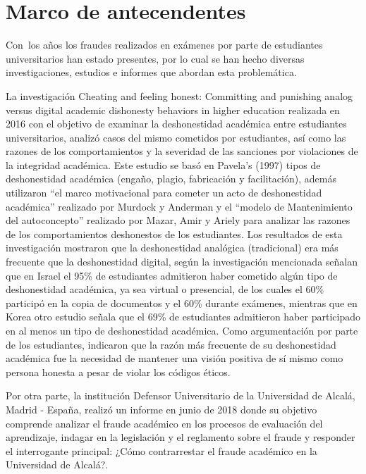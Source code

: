 \documentclass[../Main.tex]{subfiles}
\begin{document}
\section{Marco de antecendentes}

\begin{justify}
Con\ los años los fraudes realizados en exámenes por parte de estudiantes universitarios han estado presentes, por lo cual se han hecho diversas investigaciones, estudios e informes  que abordan esta problemática.
\end{justify}\par

\begin{justify}
La investigación Cheating and feeling honest: Committing and punishing analog versus digital academic dishonesty behaviors in higher education \cite{5} realizada en 2016 con el objetivo de examinar la deshonestidad académica entre estudiantes universitarios, analizó casos del mismo cometidos por estudiantes, así como las razones de los comportamientos y la severidad de las sanciones por violaciones de la integridad académica. Este estudio se basó en Pavela’s (1997) \cite{6} tipos de deshonestidad académica (engaño, plagio, fabricación y facilitación), además utilizaron “el marco motivacional para cometer un acto de deshonestidad académica” realizado por Murdock y Anderman \cite{7} y el “modelo de Mantenimiento del autoconcepto” realizado por Mazar, Amir y Ariely \cite{8} para analizar las razones de los comportamientos deshonestos de los estudiantes. Los resultados de esta investigación mostraron que la deshonestidad analógica (tradicional) era más frecuente que la deshonestidad digital, según la investigación mencionada señalan que en Israel el 95\% de estudiantes admitieron haber cometido algún tipo de deshonestidad académica, ya sea virtual o presencial, de los cuales el 60\% participó en la copia de documentos y el 60\% durante exámenes, mientras que en Korea otro estudio señala que el 69\% de estudiantes admitieron haber participado en al menos un tipo de deshonestidad académica. Como argumentación por parte de los estudiantes, indicaron que la razón más frecuente de su deshonestidad académica fue la necesidad de mantener una visión positiva de sí mismo como persona honesta a pesar de violar los códigos éticos.
\end{justify}\par

\begin{justify}
Por otra parte, la institución Defensor Universitario de la Universidad de Alcalá, Madrid - España, realizó un informe \cite{9} en junio de 2018 donde su objetivo comprende analizar el fraude  académico en los procesos de evaluación del aprendizaje, indagar en la legislación y el reglamento sobre el fraude y responder el interrogante principal: ¿Cómo contrarrestar el fraude académico en la Universidad de Alcalá?.
\end{justify}\par
\end{document}
